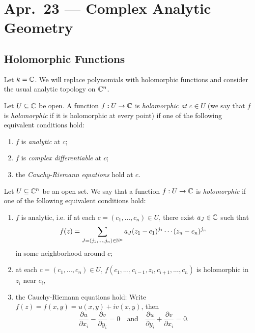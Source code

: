 \chapter{Apr.~23 --- Complex Analytic Geometry}

\section{Holomorphic Functions}

\begin{remark}
  Let $k = \mathbb{C}$. We will replace polynomials
  with holomorphic functions and consider
  the usual analytic topology on $\mathbb{C}^n$.
\end{remark}

\begin{definition}
  Let $U \subseteq \mathbb{C}$ be open.
  A function $f : U \to \mathbb{C}$ is
  \emph{holomorphic at $c \in U$} (we
  say that $f$ is \emph{holomorphic} if it is
  holomorphic at every point) if one of the
  following equivalent conditions hold:
  \begin{enumerate}
    \item $f$ is \emph{analytic} at $c$;
    \item $f$ is \emph{complex differentiable} at $c$;
    \item the \emph{Cauchy-Riemann
      equations} hold at $c$.
  \end{enumerate}
\end{definition}

\begin{definition}
  Let $U \subseteq \mathbb{C}^n$ be an open set.
  We say that a function
  $f : U \to \mathbb{C}$ is \emph{holomorphic} if
  one of the following equivalent conditions hold:
  \begin{enumerate}
    \item $f$ is analytic, i.e. if at each
      $c = (c_1, \dots, c_n) \in U$,
      there exist $a_J \in \mathbb{C}$ such that
      \[
        f(z)
        = \sum_{J = (j_1, \dots, j_n) \in \mathbb{N}^n}
        a_J (z_1 - c_1)^{j_1} \cdots (z_n - c_n)^{j_n}
      \]
      in some neighborhood around $c$;
    \item at each $c = (c_1, \dots, c_n) \in U$,
      $f(c_1, \dots, c_{i - 1}, z_i, c_{i + 1}, \dots, c_n)$
      is holomorphic in $z_i$ near $c_i$,
    \item the Cauchy-Riemann equations hold:
      Write $f(z) = f(x, y) = u(x, y) + iv(x, y)$, then
      \[
        \frac{\partial u}{\partial x_i}
        - \frac{\partial v}{\partial y_i} = 0
        \quad\text{and}\quad
        \frac{\partial u}{\partial y_i}
        + \frac{\partial v}{\partial x_i} = 0.
      \]
  \end{enumerate}
\end{definition}

